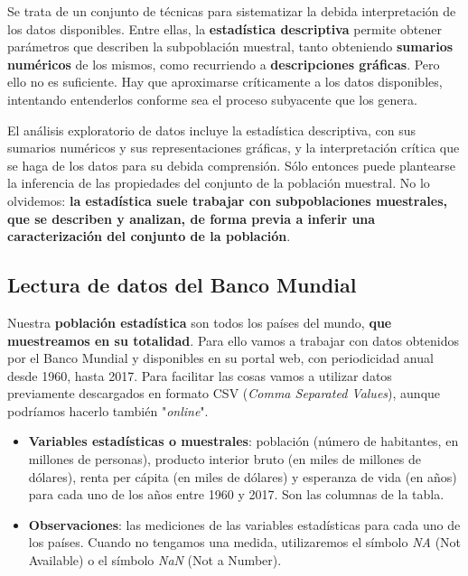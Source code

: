 \documentclass[11pt]{article}
\providecommand{\tightlist}{%
      \setlength{\itemsep}{0pt}\setlength{\parskip}{0pt}}
\begin{document}
Se trata de un conjunto de técnicas para sistematizar la debida
interpretación de los datos disponibles. Entre ellas, la
\textbf{estadística descriptiva} permite obtener parámetros que
describen la subpoblación muestral, tanto obteniendo \textbf{sumarios
numéricos} de los mismos, como recurriendo a \textbf{descripciones
gráficas}. Pero ello no es suficiente. Hay que aproximarse críticamente
a los datos disponibles, intentando entenderlos conforme sea el proceso
subyacente que los genera.

El análisis exploratorio de datos incluye la estadística descriptiva,
con sus sumarios numéricos y sus representaciones gráficas, y la
interpretación crítica que se haga de los datos para su debida
comprensión. Sólo entonces puede plantearse la inferencia de las
propiedades del conjunto de la población muestral. No lo olvidemos:
\textbf{la estadística suele trabajar con subpoblaciones muestrales, que
se describen y analizan, de forma previa a inferir una caracterización
del conjunto de la población}.

    \subsection*{Lectura de datos del Banco
Mundial}\label{lectura-de-datos-del-banco-mundial}

Nuestra \textbf{población estadística} son todos los países del mundo,
\textbf{que muestreamos en su totalidad}. Para ello vamos a trabajar con
datos obtenidos por el Banco Mundial y disponibles en su portal web, con
periodicidad anual desde 1960, hasta 2017. Para facilitar las cosas
vamos a utilizar datos previamente descargados en formato CSV
(\emph{Comma Separated Values}), aunque podríamos hacerlo también
"\emph{online}".

\begin{itemize}
\tightlist
\item
  \textbf{Variables estadísticas o muestrales}: población (número de
  habitantes, en millones de personas), producto interior bruto (en
  miles de millones de dólares), renta per cápita (en miles de dólares)
  y esperanza de vida (en años) para cada uno de los años entre 1960 y
  2017. Son las columnas de la tabla.
\item
  \textbf{Observaciones}: las mediciones de las variables estadísticas
  para cada uno de los países. Cuando no tengamos una medida,
  utilizaremos el símbolo \emph{NA} (Not Available) o el símbolo
  \emph{NaN} (Not a Number).
\end{itemize}
\end{document}
